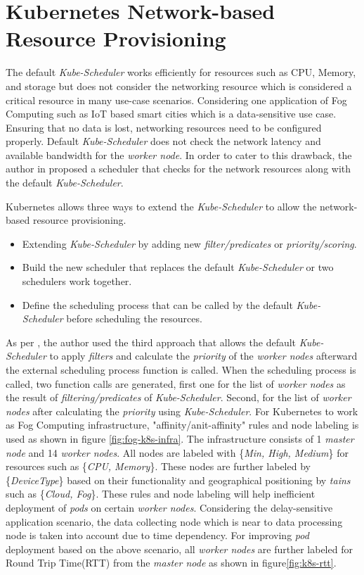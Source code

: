 \section{Kubernetes Network-based Resource Provisioning}
\label{sec:k8s_ns}
The default \emph{Kube-Scheduler} works efficiently for resources such as CPU, Memory, and storage but does not consider the networking resource which is considered a critical resource in many use-case scenarios. Considering one application of Fog Computing such as IoT based smart cities which is a data-sensitive use case. Ensuring that no data is lost, networking resources need to be configured properly\cite{Santos2019}. Default \emph{Kube-Scheduler} does not check the network latency and available bandwidth for the \emph{worker node}. In order to cater to this drawback, the author in \cite{Santos2019} proposed a scheduler that checks for the network resources along with the default \emph{Kube-Scheduler}. \par
Kubernetes allows three ways to extend the \emph{Kube-Scheduler} to allow the network-based resource provisioning\cite{k8s}.
\begin{itemize}
  \item Extending \emph{Kube-Scheduler} by adding new \emph{filter/predicates} or \emph{priority/scoring}.
  \item Build the new scheduler that replaces the default \emph{Kube-Scheduler} or two schedulers work together.
  \item Define the scheduling process that can be called by the default \emph{Kube-Scheduler} before scheduling the resources.
\end{itemize}
As per \cite{Santos2019}, the author used the third approach that allows the default \emph{Kube-Scheduler} to apply \emph{filters} and calculate the \emph{priority} of the \emph{worker nodes} afterward the external scheduling process function is called. When the scheduling process is called, two function calls are generated\cite{Santos2019}, first one for the list of \emph{worker nodes} as the result of \emph{filtering/predicates} of \emph{Kube-Scheduler}\cite{Santos2019}. Second, for the list of \emph{worker nodes} after calculating the \emph{priority} using \emph{Kube-Scheduler}\cite{Santos2019}. For Kubernetes to work as Fog Computing infrastructure, "affinity/anit-affinity" rules and node labeling is used as shown in figure \ref{fig:fog-k8s-infra}. The infrastructure consists of 1 \emph{master node} and 14 \emph{worker nodes}. All nodes are labeled with \{\emph{Min, High, Medium}\} for resources such as \{\emph{CPU, Memory}\}\cite{Santos2019}. These nodes are further labeled by \{\emph{DeviceType}\} based on their functionality and geographical positioning by \emph{tains} such as \{\emph{Cloud, Fog}\}\cite{Santos2019}. These rules and node labeling will help inefficient deployment of \emph{pods} on certain \emph{worker nodes}. Considering the delay-sensitive application scenario, the data collecting node which is near to data processing node is taken into account due to time dependency\cite{Santos2019}. For improving \emph{pod} deployment based on the above scenario, all \emph{worker nodes} are further labeled for Round Trip Time(RTT) from the \emph{master node} as shown in figure\ref{fig:k8s-rtt}.\par
